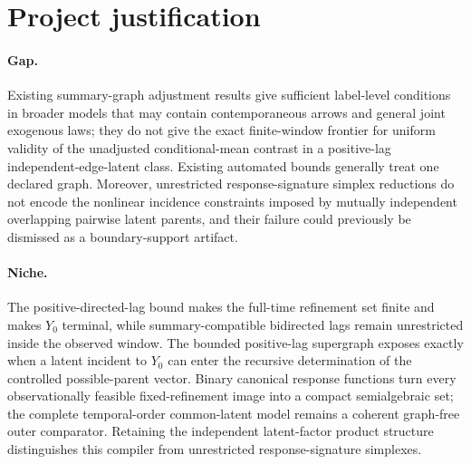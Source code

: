 \documentclass{article}
\begin{document}
\section{Project justification}

\paragraph{Gap.} Existing summary-graph adjustment results give sufficient label-level conditions in broader models that may contain contemporaneous arrows and general joint exogenous laws; they do not give the exact finite-window frontier for uniform validity of the unadjusted conditional-mean contrast in a positive-lag independent-edge-latent class. Existing automated bounds generally treat one declared graph. Moreover, unrestricted response-signature simplex reductions do not encode the nonlinear incidence constraints imposed by mutually independent overlapping pairwise latent parents, and their failure could previously be dismissed as a boundary-support artifact.

\paragraph{Niche.} The positive-directed-lag bound makes the full-time refinement set finite and makes \(Y_0\) terminal, while summary-compatible bidirected lags remain unrestricted inside the observed window. The bounded positive-lag supergraph exposes exactly when a latent incident to \(Y_0\) can enter the recursive determination of the controlled possible-parent vector. Binary canonical response functions turn every observationally feasible fixed-refinement image into a compact semialgebraic set; the complete temporal-order common-latent model remains a coherent graph-free outer comparator. Retaining the independent latent-factor product structure distinguishes this compiler from unrestricted response-signature simplexes.
\end{document}
